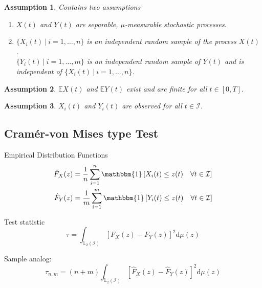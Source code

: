 \documentclass[11pt,twoside,a4paper]{article}
\theoremstyle{MAstyle} \newtheorem{assumption}{Assumption}
\theoremstyle{MAstyle} \newtheorem{definition}{Definition}
\begin{document}
			\begin{assumption} Contains two assumptions
				\begin{enumerate}
					\item $X(t)$ and $Y(t)$ are separable, $\mu$-measurable stochastic processes.
					\item $\{X_i(t) \: \vert \: i = 1, \dots, n\}$ is an independent random sample of the process $X(t)$. \\
					$\{Y_i(t) \: \vert \: i = 1, \dots, m\}$ is an independent random sample of $Y(t)$ and is independent of $\{X_i(t) \: \vert \: i = 1, \dots, n\}$.
				\end{enumerate}
			\end{assumption}
		
			\begin{assumption}
				$\mathbb{E}X(t)$ and $\mathbb{E}Y(t)$ exist and are finite for all $t \in [0, T]$.
			\end{assumption}
		
			\begin{assumption}
				$X_i(t)$ and $Y_i(t)$ are observed for all $t \in \mathcal{I}$.
			\end{assumption}
	
		
			
		
		\subsection{Cram\'{e}r-von Mises type Test}
		
			Empirical Distribution Functions
			\begin{equation}
				\begin{split}
					\hat{F}_X(z) &= \frac{1}{n} \sum_{i = 1}^{n}\mathbbm{1}\left[X_i(t) \leq z(t) \quad \forall t \in \mathcal{I}\right] \\
					\hat{F}_Y(z) &= \frac{1}{m} \sum_{i = 1}^{m}\mathbbm{1}\left[Y_i(t) \leq z(t) \quad \forall t \in \mathcal{I}\right]
				\end{split}
			\end{equation}
			
			Test statistic
			\begin{equation}
				\tau = \int_{\mathbb{L}_2(\mathcal{I})}\left[F_X(z) - F_Y(z)\right]^2 \mathrm{d} \mu(z)
			\end{equation}
			
			Sample analog:
			\begin{equation}
				\tau_{n,m} = (n+m) \int_{\mathbb{L}_2(\mathcal{I})}\left[\hat{F}_X(z) - \hat{F}_Y(z)\right]^2 \mathrm{d} \mu(z)
			\end{equation}
		
\end{document}

